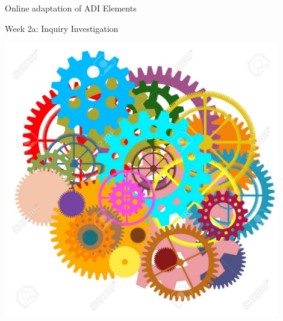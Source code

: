 \documentclass[xcolor=dvipsnames,table]{beamer}
\begin{document}
{\begin{frame}{Online adaptation of ADI Elements}
\begin{block}{Week 2a: Inquiry Investigation}
\begin{minipage}{0.2\textwidth}
      \centering \includegraphics[width=0.9\textwidth]{./clipart/gears.jpg}
    \end{minipage}
  \end{block}
\end{frame}

}
\end{document}
